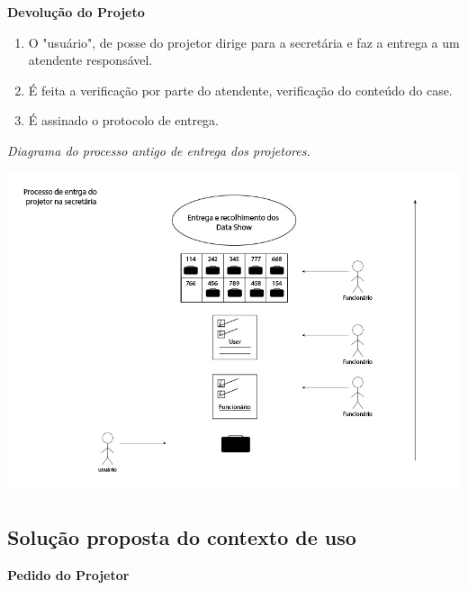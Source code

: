 \newpage
\textbf{Devolução do Projeto}

\begin{enumerate}
  
  \item O "usuário", de posse do projetor dirige para a secretária e faz a
    entrega a um atendente responsável. 

  \item É feita a verificação por parte do atendente, verificação do conteúdo do
    case. 

  \item É assinado o protocolo de entrega. 

\end{enumerate}


\textit{Diagrama do processo antigo de entrega dos projetores.}

  \begin{center}
    \includegraphics[scale=0.5]{imagens/fluxo3.jpg}\\
  \end{center}
  

\newpage

\subsection{Solução proposta do contexto de uso}

\textbf{Pedido do Projetor}

